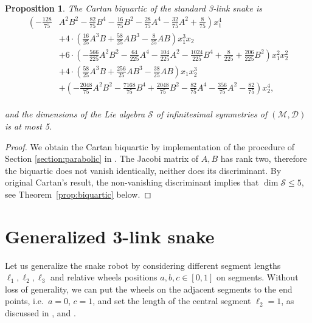 \documentclass{amsart}
\theoremstyle{plain}
\newtheorem{proposition}[theorem]{Proposition}
\theoremstyle{definition}
\theoremstyle{remark}
\newcommand{\mc}[1]{\mathcal{#1}}
\begin{document}
\begin{proposition} \label{prop:std_snake_symmetries}
    The Cartan biquartic of the standard 3-link snake is\\
{\footnotesize
    \begin{equation}
    \begin{aligned}
        \left(-\frac{128}{75}\right. &A^2 B^2 - \frac{82}{75} B^4 - \frac{16}{75} B^2- \frac{28}{75} A^4 - \frac{32}{75} A^2 + \left. \frac{8}{75} \right) x_1^4\\
        &+ 4 \cdot \left(\frac{16}{25} A^3 B+\frac{58}{25} A B^3-\frac{8}{25} A B \right) x_1^3 x_2\\
        &+ 6 \cdot \left(-\frac{566}{225} A^2 B^2 - \frac{64}{225} A^4 - \frac{104}{225} A^2 - \frac{1024}{225} B^4+ \frac{8}{225} + \frac{206}{225} B^2\right) x_1^2 x_2^2\\
        &+ 4 \cdot \left( \frac{58}{25} A^3 B + \frac{256}{25} A B^3 - \frac{38}{25} A B \right) x_1 x_2^3\\
        &+ \left( -\frac{2048}{75} A^2 B^2 - \frac{7168}{75} B^4 + \frac{2048}{75} B^2 - \frac{82}{75} A^4 - \frac{356}{75} A^2 - \frac{82}{75} \right) x_2^4,
    \end{aligned}
    \end{equation}}
\\ 
and the dimensions of the Lie algebra $\mc{S}$ of infinitesimal symmetries of $(\mc{M},\mc{D})$ is at most 5. %
\end{proposition}
\begin{proof}
    We obtain the Cartan biquartic by implementation of the procedure of Section \ref{section:parabolic} in \cite[\texttt{std\_snake.mw}]{attached_files}. The Jacobi matrix of $A,B$ has rank two, therefore the biquartic does not vanish identically, neither does its discriminant. By original Cartan's result, the non-vanishing discriminant implies that $\dim \mc{S} \leq 5$, see Theorem~\ref{prop:biquartic} below.
\end{proof}

\section{Generalized 3-link snake} \label{section:gen_snake}

Let us generalize the snake robot by considering different segment lengths $\ell_1, \ell_2, \ell_3$ and relative wheels positions $a, b, c \in [0,1]$ on segments. Without loss of generality, we can put the wheels on the adjacent segments to the end points, i.e.~$a = 0$, $c = 1$, and set the length of the central segment $\ell_2 = 1$, as discussed in \cite{tf2024}, \cite{md2024} and \cite{dt2018}.
\end{document}
